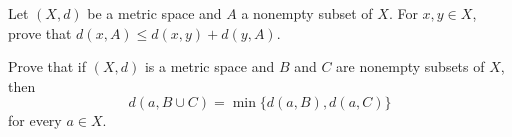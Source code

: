 \item \label{ex:GLB_triangle} Let $(X,d)$ be a metric space and $A$ a nonempty subset of $X$. For $x,y \in X$, prove that $d(x,A) \leq d(x,y) + d(y,A)$.

\begin{comment}

\ExerciseSolution Let $(X,d)$ be a metric space and $A$ a nonempty subset of $X$. Let $x$ and $y$ be elements of $X$, and let $a \in A$. By definition, we know that 
\[d(x,A) \leq d(x,a).\]
The triangle inequality then gives us 
\[d(x,A) \leq d(x,a) \leq d(x,y) + d(y,a).\]
So $d(y,a) \geq d(x,A) - d(x,y)$. Thus, $d(x,A) - d(x,y)$ is a lower bound for the set $\{d(y,a) \mid a \in A\}$. Since we know that $d(y,A)~=~\inf_{a \in A} \{d(y,a)\}$ is the greatest lower bound for the set $\{d(y,a) \mid a \in A\}$, it follows that  
\[d(y,A) \geq d(x,A) - d(x,y)\]
or
\[d(x,A) \leq d(x,y) + d(y,A).\]


\end{comment}

\item Prove that if $(X,d)$ is a metric space and $B$ and $C$ are nonempty subsets of $X$, then 
\[d(a, B \cup C) = \min\{d(a,B), d(a,C)\}\]
for every $a \in X$. 

\begin{comment}

\ExerciseSolution Recall that $d(a,B \cup C) = \inf\{d(a,x) \mid x \in B \cup C\}$. Without loss of generality, assume that $d(a,B) \leq d(a,C)$. We will show that $d(a, B \cup C) = d(a,B)$. First we show that $d(a,B)$ is a lower bound for $\{d(a,x) \mid x \in B \cup C\}$. Let $x \in B \cup C$. Then $x \in B$ or $x \in C$. If $x \in B$, then by definition $d(a,B) \leq d(a,x)$. If $x \in C$, then $d(a,B) \leq d(a,C) \leq d(a,x)$. Thus, $d(a,B)$ is a lower bound for $\{d(a,x) \mid x \in B \cup C\}$. 

Now we demonstrate that $d(a,B)$ is greater than or equal to any other lower bound for $\{d(a,x) \mid x \in B \cup C\}$. Let $m$ be a lower bound for $\{d(a,x) \mid x \in B \cup C\}$ and assume to the contrary that $m > d(a,B) = \inf\{d(a,b) \mid b \in B\}$. Then there must exist an element $b \in B$ with $m > d(a,b)$. But $b \in B \cup C$ and so $m \leq d(a,b)$, a contradiction. We conclude that $d(a,B)$ is a lower bound for $\{d(a,x) \mid x \in B \cup C\}$ and is greater than or equal to any other lower bound for $\{d(a,x) \mid x \in B \cup C\}$. It follows that $d(a,B) = d(a, B \cup C)$.  

\end{comment}	

